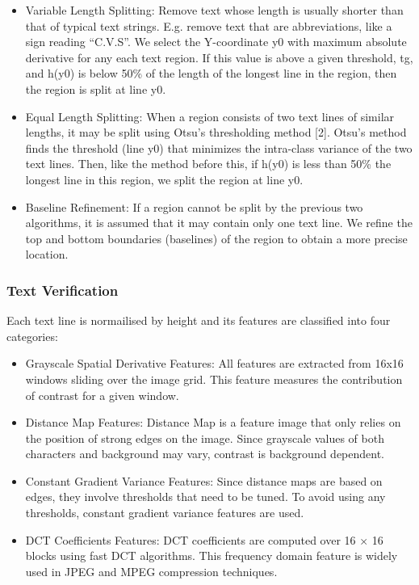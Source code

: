 \documentclass[a4paper,12pt]{article}
\begin{document}
\begin{itemize}
\item
Variable Length Splitting: Remove text whose length is usually shorter than that of typical text strings. E.g. remove text that are abbreviations, like a sign reading “C.V.S”. We select the Y-coordinate y0 with maximum absolute derivative for any each text region. If this value is above a given threshold, tg, and h(y0) is below 50\% of the length of the longest line in the region, then the region is split at line y0.

\item
Equal Length Splitting: When a region consists of two text lines of similar lengths, it may be split using Otsu’s thresholding method [2]. Otsu’s method finds the threshold (line y0) that minimizes the intra-class variance of the two text lines. Then, like the method before this, if h(y0) is less than 50\% the longest line in this region, we split the region at line y0.

\item
Baseline Refinement: If a region cannot be split by the previous two algorithms, it is assumed that it may contain only one text line. We refine the top and bottom boundaries (baselines) of the region to obtain a more precise location.
\end{itemize}


\subsubsection{Text Verification}

Each text line is normailised by height and its features are classified into four categories:

\begin{itemize}
\item
Grayscale Spatial Derivative Features: All features are extracted from 16x16 windows sliding over the image grid. This feature measures the contribution of contrast for a given window.
\item
Distance Map Features: Distance Map is a feature image that only relies on the position of strong edges on the image. Since grayscale values of both characters and background may vary, contrast is background dependent.
\item
Constant Gradient Variance Features: Since distance maps are based on edges, they involve thresholds that need to be tuned. To avoid using any thresholds, constant gradient variance features are used.
\item
DCT Coefficients Features: DCT coefficients are computed over 16 × 16 blocks using fast DCT algorithms. This frequency domain feature is widely used in JPEG and MPEG compression techniques.
\end{itemize}
\end{document}
